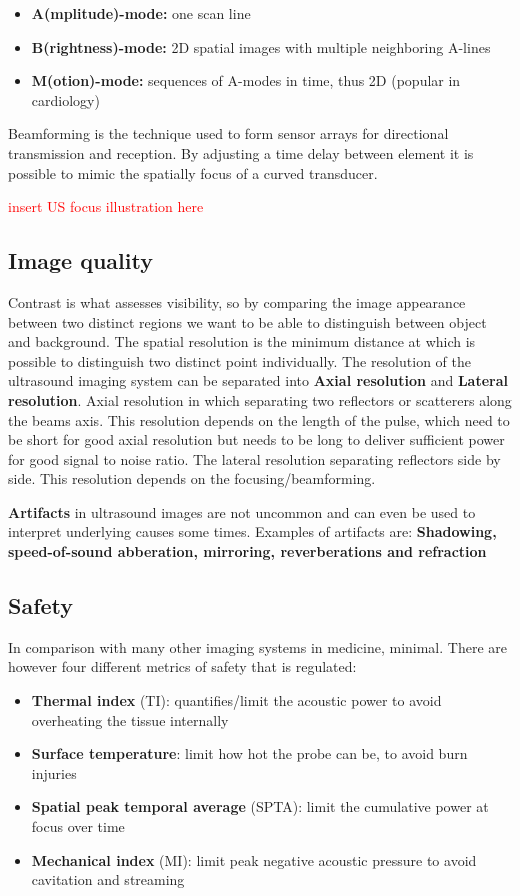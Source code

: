 		\begin{itemize}
			\item \textbf{A(mplitude)-mode:} one scan line
			\item \textbf{B(rightness)-mode:} 2D spatial images with multiple neighboring A-lines
			\item \textbf{M(otion)-mode:} sequences of A-modes in time, thus 2D (popular in cardiology) 
		\end{itemize}

	Beamforming is the technique used to form sensor arrays for directional transmission and reception. By adjusting a time delay between element it is possible to mimic the spatially focus of a curved transducer. 

	\textcolor{red}{insert US focus illustration here} 


	\subsection*{Image quality}
	Contrast is what assesses visibility, so by comparing the image appearance between two distinct regions we want to be able to distinguish between object and background. The spatial resolution is the minimum distance at which is possible to distinguish two distinct point individually. The resolution of the ultrasound imaging system can be separated into \textbf{Axial resolution} and \textbf{Lateral resolution}. Axial resolution in which separating two reflectors or scatterers along the beams axis. This resolution depends on the length of the pulse, which need to be short for good axial resolution but needs to be long to deliver sufficient power for good signal to noise ratio. The lateral resolution separating reflectors side by side. This resolution depends on the focusing/beamforming. 

	\textbf{Artifacts} in ultrasound images are not uncommon and can even be used to interpret underlying causes some times. Examples of artifacts are: \textbf{Shadowing, speed-of-sound abberation, mirroring, reverberations and refraction} 

	\subsection*{Safety}
	In comparison with many other imaging systems in medicine, minimal. There are however four different metrics of safety that is regulated: 

		\begin{itemize}
			\item \textbf{Thermal index} (TI): quantifies/limit the acoustic power to avoid overheating the tissue internally
			\item \textbf{Surface temperature}: limit how hot the probe can be, to avoid burn injuries 
			\item \textbf{Spatial peak temporal average} (SPTA): limit the cumulative power at focus over time
			\item \textbf{Mechanical index} (MI):  limit peak negative acoustic pressure to avoid cavitation and streaming
		\end{itemize}


